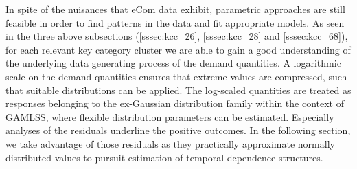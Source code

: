 
In spite of the nuisances that eCom data exhibit, parametric approaches are still feasible in order to find patterns in the data and fit appropriate models. As seen in the three above subsections (\ref{sssec:kcc_26}, \ref{sssec:kcc_28} and \ref{sssec:kcc_68}), for each relevant key category cluster we are able to gain a good understanding of the underlying data generating process of the demand quantities. A logarithmic scale on the demand quantities ensures that extreme values are compressed, such that suitable distributions can be applied. The log-scaled quantities are treated as responses belonging to the ex-Gaussian distribution family within the context of \ac{GAMLSS}, where flexible distribution parameters can be estimated. Especially analyses of the residuals underline the positive outcomes. In the following section, we take advantage of those residuals as they practically approximate normally distributed values to pursuit estimation of temporal dependence structures.